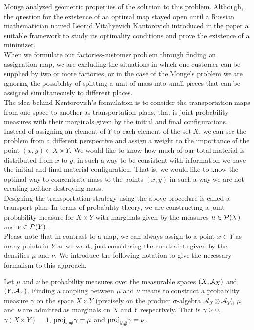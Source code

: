 Monge analyzed geometric properties of the solution to this problem. Although, the question for the existence of an optimal map stayed open until a Russian mathematician named Leonid Vitaliyevich Kantorovich introduced in the paper \cite{Kantorovich1942} a suitable framework to study its optimality conditions and prove the existence of a minimizer. \\

When we formulate our factories-customer problem through finding an assignation map, we are excluding the situations in which one customer can be supplied by two or more factories, or in the case of the Monge's problem we are ignoring the possibility of splitting a unit of mass into small pieces that can be assigned simultaneously to different places. \\

The idea behind Kantorovich's formulation is to consider the transportation maps from one space to another as transportation plans, that is joint probability measures with their marginals given by the initial and final configurations.\\

Instead of assigning an element of $Y$ to each element of the set $X$, we can see the problem from a different perspective and assign a weight to the importance of the point $\left(x, y\right)\in X\times Y$. We would like to know how much of our total material is distributed from $x$ to $y$, in such a way to be consistent with information we have the initial and final material configuration. That is, we would like to know the optimal way to concentrate mass to the points $(x, y)$ in such a way we are not creating neither destroying mass. \\

Designing the transportation strategy using the above procedure is called a transport plan. In terms of probability theory, we are constructing a joint probability measure for $X\times Y$ with marginals given by the measures $\mu \in \mathcal{P}(X)$ and $\nu \in \mathcal{P}(Y)$. \\

Please note that in contrast to a map, we can always assign to a point $x\in Y$ as many points in $Y$ as we want, just considering the constraints given by the densities $\mu$ and $\nu$. We introduce the following notation to give the necessary formalism to this approach. 

\begin{definition}[Coupling]
Let $\mu$ and $\nu$ be probability measures over the measurable spaces $\left( X, \mathcal{A}_X \right)$ and $\left( Y, \mathcal{A}_Y \right)$. Finding a coupling between $\mu$ and $\nu$ means to construct a probability measure $\gamma$ on the space $X\times Y$ (precisely on the product $\sigma$-algebra $\mathcal{A}_X\otimes\mathcal{A}_Y$), $\mu$ and $\nu$ are admitted as marginals on $X$ and $Y$ respectively. That is $\gamma\geq 0$, $\gamma(X\times Y)=1$, ${\mathrm{proj}_x}_{\#} \gamma=\mu$ and ${\mathrm{proj}_y}_{\#} \gamma=\nu$. \label{def: Coupling}
\end{definition}
 

